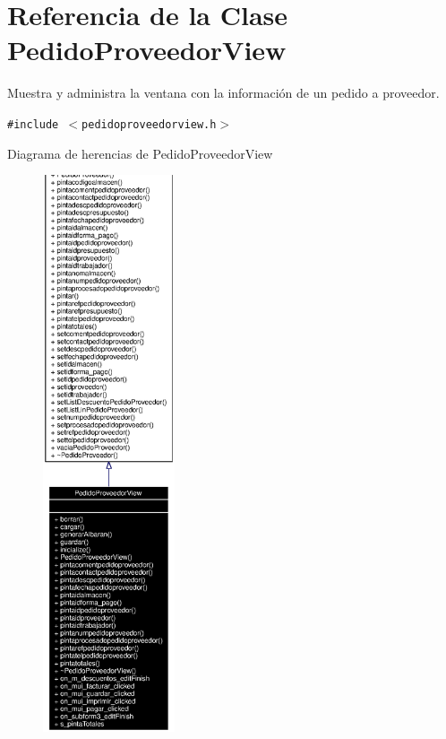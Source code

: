 \section{Referencia de la Clase Pedido\-Proveedor\-View}
\label{classPedidoProveedorView}
Muestra y administra la ventana con la informaci\'{o}n de un pedido a proveedor.  


{\tt \#include $<$pedidoproveedorview.h$>$}

Diagrama de herencias de Pedido\-Proveedor\-View\begin{figure}[H]
\begin{center}
\leavevmode
\includegraphics[width=110pt]{classPedidoProveedorView__inherit__graph}
\end{center}
\end{figure}
